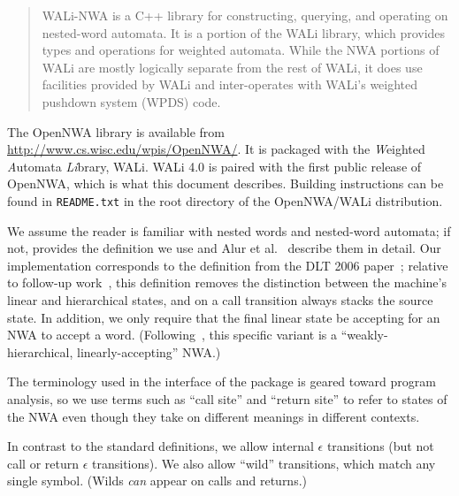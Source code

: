\begin{abstract}

WALi-NWA is a C++ library for constructing, querying, and operating on
nested-word automata.  It is a portion of the WALi library, which provides
types and operations for weighted automata.
While the NWA portions of WALi
are mostly logically separate from the rest of WALi, it does use
facilities provided by WALi and inter-operates with WALi's weighted pushdown
system (WPDS) code.

\end{abstract}


The OpenNWA library is available from
\url{http://www.cs.wisc.edu/wpis/OpenNWA/}. It is packaged with the
\textit{W}eighted \textit{A}utomata \textit{Li}brary, WALi. WALi 4.0 is
paired with the first public release of OpenNWA, which is what this document
describes. Building instructions can be found in \texttt{README.txt} in the
root directory of the OpenNWA/WALi distribution.

We assume the reader is familiar with nested words and
nested-word automata; if not,  provides the definition
we use and
Alur et al.~\cite{DLT:AM2006,JACM:AM2009} describe them in detail. Our
implementation corresponds to the definition from the DLT 2006
paper~\cite{DLT:AM2006}; relative to follow-up work~\cite{JACM:AM2009}, this definition removes
the distinction between the machine's linear and hierarchical states, and on
a call transition always stacks the source state. In addition, we only require that the
final linear state be accepting for an NWA to accept a
word. (Following~\cite{JACM:AM2009}, this specific variant is a
``weakly-hierarchical, linearly-accepting'' NWA.)

The terminology used in the interface of the package is geared
toward program analysis, so we use terms such as ``call site'' and ``return
site'' to refer to states of the NWA even though they take on different
meanings in different contexts.

In contrast to the standard definitions, we allow internal $\epsilon$
transitions (but not call or return $\epsilon$ transitions). We also allow ``wild''
transitions, which match any single symbol. (Wilds \emph{can} appear on calls
and returns.)


